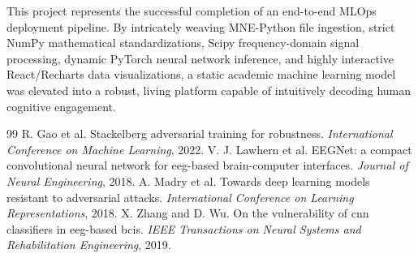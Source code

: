 \documentclass[10pt,a4paper,openright]{report}
\begin{document}
This project represents the successful completion of an end-to-end MLOps deployment pipeline. By intricately weaving MNE-Python file ingestion, strict NumPy mathematical standardizations, Scipy frequency-domain signal processing, dynamic PyTorch neural network inference, and highly interactive React/Recharts data visualizations, a static academic machine learning model was elevated into a robust, living platform capable of intuitively decoding human cognitive engagement.

\begin{thebibliography}{99}
R. Gao et al. Stackelberg adversarial training for robustness. \emph{International Conference on Machine Learning}, 2022.
V. J. Lawhern et al. EEGNet: a compact convolutional neural network for eeg-based brain-computer interfaces. \emph{Journal of Neural Engineering}, 2018.
A. Madry et al. Towards deep learning models resistant to adversarial attacks. \emph{International Conference on Learning Representations}, 2018.
X. Zhang and D. Wu. On the vulnerability of cnn classifiers in eeg-based bcis. \emph{IEEE Transactions on Neural Systems and Rehabilitation Engineering}, 2019.
\end{thebibliography}
\end{document}
